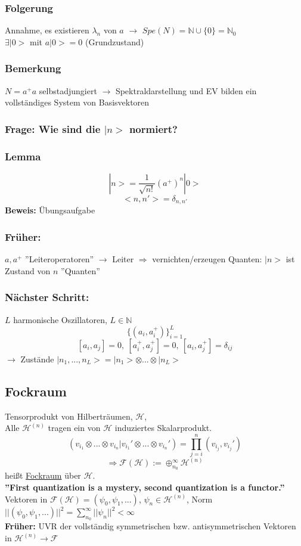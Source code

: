 \documentclass[twoside,a4paper]{scrartcl}
\renewcommand{\1}{\mathds{1}}
\newcommand{\Ra}{\Rightarrow}
\newcommand{\ra}{\rightarrow}
\renewcommand{\l}{\lambda}
\renewcommand{\H}{\mathcal{H}}
\newcommand{\F}{\mathcal{F}}
\begin{document}
\subsubsection*{Folgerung} 
Annahme, es existieren $\l_n$ von $a$ $\ra$ $Spe(N)=\mathbb{N} \cup \{0\}=\mathbb{N}_0$\\
$\exists |0>$ mit $a|0>=0$ (Grundzustand)
\subsubsection*{Bemerkung} 
$N=a^+a$ selbstadjungiert $\ra$ Spektraldarstellung und EV bilden ein vollständiges System von Basisvektoren
\subsubsection*{Frage: Wie sind die $|n>$ normiert?} 
\subsubsection*{Lemma} 
$$|n>=\frac{1}{\sqrt{n!}}(a^+)^n|0>$$
$$<n,n'>=\delta_{n,n'}$$
\textbf{Beweis:} Übungsaufgabe
\subsubsection*{Früher:} 
$a,a^+$ ''Leiteroperatoren'' $\ra$ Leiter $\Ra$ vernichten/erzeugen Quanten: $|n>$ ist Zustand von $n$ ''Quanten''
\subsubsection*{Nächster Schritt:} 
$L$ harmonische Oszillatoren, $L\in \mathbb{N}$
$$\{(a_i,a_i^+)\}^L_{i=1}$$
$$[a_i,a_j]=0, \ [a_i^+,a_j^+]=0, \ [a_i,a_j^+]=\delta_{ij}$$
$\ra$ Zustände $|n_1,...,n_L>=|n_1>\otimes ... \otimes |n_L>$

\subsection{Fockraum} 
Tensorprodukt von Hilberträumen, $\H$,\\
Alle $\H^{(n)}$ tragen ein von $\H$ induziertes Skalarprodukt.
$$(v_{i_1}\otimes ... \otimes v_{i_n}|v_{i_1}'\otimes ... \otimes v_{i_n}')=\prod_{j=i}^n (v_{i_j},v_{i_j}')$$
$$\Ra \F(\H):=\oplus_{n_0}^\infty \H^{(n)}$$
heißt \underline{Fockraum} über $\H$.\\
\textbf{''First quantization is a mystery, second quantization is a functor.''}\\
Vektoren in $\F(\H)=(\psi_0,\psi_1,...)$, $\psi_n\in \H^{(n)}$, Norm $||(\psi_0,\psi_1,...)||^2=\sum_{n_0}^\infty||\psi_n||^2 <\infty$\\
\textbf{Früher:} UVR der vollständig symmetrischen bzw. antisymmetrischen Vektoren in $\H^{(n)} \ra \F$
\end{document}
